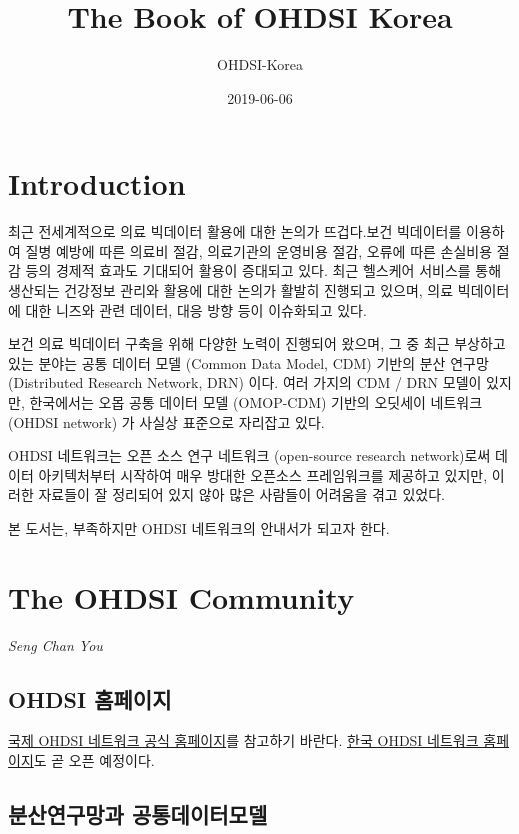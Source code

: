 \documentclass[]{book}
\title{The Book of OHDSI Korea}
\author{OHDSI-Korea}
\date{2019-06-06}
\begin{document}
\maketitle

{
\setcounter{tocdepth}{1}
\tableofcontents
}
\hypertarget{introduction}{%
\chapter{Introduction}\label{introduction}}

최근 전세계적으로 의료 빅데이터 활용에 대한 논의가 뜨겁다.보건 빅데이터를 이용하여 질병 예방에 따른 의료비 절감, 의료기관의 운영비용 절감, 오류에 따른 손실비용 절감 등의 경제적 효과도 기대되어 활용이 증대되고 있다. 최근 헬스케어 서비스를 통해 생산되는 건강정보 관리와 활용에 대한 논의가 활발히 진행되고 있으며, 의료 빅데이터에 대한 니즈와 관련 데이터, 대응 방향 등이 이슈화되고 있다.

보건 의료 빅데이터 구축을 위해 다양한 노력이 진행되어 왔으며, 그 중 최근 부상하고 있는 분야는 공통 데이터 모델 (Common Data Model, CDM) 기반의 분산 연구망 (Distributed Research Network, DRN) 이다. 여러 가지의 CDM / DRN 모델이 있지만, 한국에서는 오몹 공통 데이터 모델 (OMOP-CDM) 기반의 오딧세이 네트워크 (OHDSI network) 가 사실상 표준으로 자리잡고 있다.

OHDSI 네트워크는 오픈 소스 연구 네트워크 (open-source research network)로써 데이터 아키텍처부터 시작하여 매우 방대한 오픈소스 프레임워크를 제공하고 있지만, 이러한 자료들이 잘 정리되어 있지 않아 많은 사람들이 어려움을 겪고 있었다.

본 도서는, 부족하지만 OHDSI 네트워크의 안내서가 되고자 한다.

\hypertarget{ohdsiCommunity}{%
\chapter{The OHDSI Community}\label{ohdsiCommunity}}

\emph{Seng Chan You}

\hypertarget{ohdsi-}{%
\section{OHDSI 홈페이지}\label{ohdsi-}}

\href{https://www.ohdsi.org/}{국제 OHDSI 네트워크 공식 홈페이지}를 참고하기 바란다. \href{https://www.ohdsi-korea.org/}{한국 OHDSI 네트워크 홈페이지}도 곧 오픈 예정이다.

\hypertarget{drnCdm}{%
\section{분산연구망과 공통데이터모델}\label{drnCdm}}
\end{document}
